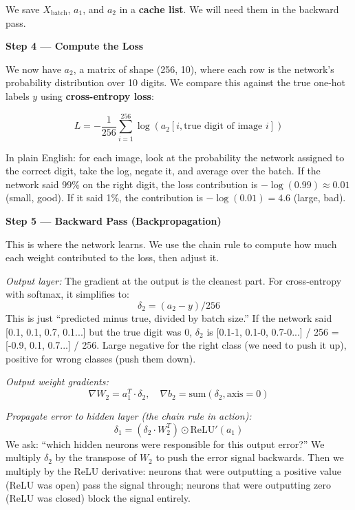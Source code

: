 \documentclass[12pt, a4paper]{article}
\begin{document}
We save $X_{\text{batch}}$, $a_1$, and $a_2$ in a \textbf{cache list}. We will need them in the backward pass.

\textbf{Step 4 --- Compute the Loss}

We now have $a_2$, a matrix of shape (256, 10), where each row is the network's probability distribution over 10 digits. We compare this against the true one-hot labels $y$ using \textbf{cross-entropy loss}:

\begin{equation}
  L = -\frac{1}{256} \sum_{i=1}^{256} \log(a_2[i, \text{true digit of image } i])
\end{equation}

In plain English: for each image, look at the probability the network assigned to the correct digit, take the log, negate it, and average over the batch. If the network said 99\% on the right digit, the loss contribution is $-\log(0.99) \approx 0.01$ (small, good). If it said 1\%, the contribution is $-\log(0.01) = 4.6$ (large, bad).

\textbf{Step 5 --- Backward Pass (Backpropagation)}

This is where the network learns. We use the chain rule to compute how much each weight contributed to the loss, then adjust it.

\textit{Output layer:} The gradient at the output is the cleanest part. For cross-entropy with softmax, it simplifies to:
\begin{equation}
  \delta_2 = (a_2 - y) / 256
\end{equation}
This is just ``predicted minus true, divided by batch size.'' If the network said [0.1, 0.1, 0.7, 0.1...] but the true digit was 0, $\delta_2$ is [0.1-1, 0.1-0, 0.7-0...] / 256 = [-0.9, 0.1, 0.7...] / 256. Large negative for the right class (we need to push it up), positive for wrong classes (push them down).

\textit{Output weight gradients:}
\begin{equation}
  \nabla W_2 = a_1^T \cdot \delta_2, \quad \nabla b_2 = \text{sum}(\delta_2, \text{axis}=0)
\end{equation}

\textit{Propagate error to hidden layer (the chain rule in action):}
\begin{equation}
  \delta_1 = (\delta_2 \cdot W_2^T) \odot \text{ReLU}'(a_1)
\end{equation}
We ask: ``which hidden neurons were responsible for this output error?'' We multiply $\delta_2$ by the transpose of $W_2$ to push the error signal backwards. Then we multiply by the ReLU derivative: neurons that were outputting a positive value (ReLU was open) pass the signal through; neurons that were outputting zero (ReLU was closed) block the signal entirely.
\end{document}
